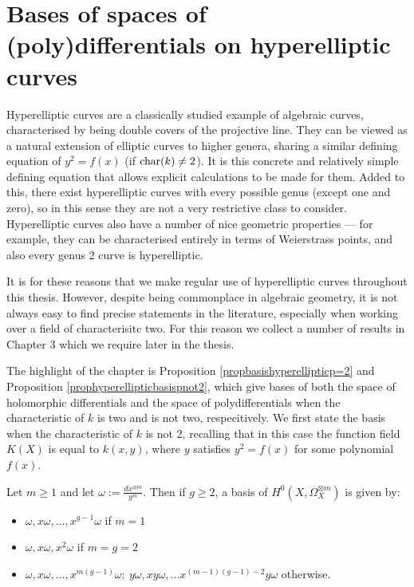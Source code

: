 \section{Bases of spaces of (poly)differentials on hyperelliptic curves}

Hyperelliptic curves are a classically studied example of algebraic curves, characterised by being double covers of the projective line.
They can be viewed as a natural extension of elliptic curves to higher genera, sharing a similar defining equation of $y^2 = f(x)$ (if $\operatorname{char}(k) \neq 2$).
It is this concrete and relatively simple defining equation that allows explicit calculations to be made for them.
Added to this, there exist hyperelliptic curves with every possible genus (except one and zero), so in this sense they are not a very restrictive class to consider.
Hyperelliptic curves also have a number of nice geometric properties --- for example, they can be characterised entirely in terms of Weierstrass points, and also every genus 2 curve is hyperelliptic.

It is for these reasons that we make regular use of hyperelliptic curves throughout this thesis.
However, despite being commonplace in algebraic geometry, it is not always easy to find precise statements in the literature, especially when working over a field of characterisitc two.
For this reason we collect a number of results in Chapter 3 which we require later in the thesis.

The highlight of the chapter is Proposition \ref{propbasishyperellipticp=2} and Proposition \ref{prophyperellipticbasispnot2}, which give bases of both the space of holomorphic differentials and the space of polydifferentials when the characteristic of $k$ is two and is not two, respecitively.
We first state the basis when the characteristic of $k$ is not 2, recalling that in this case the function field $K(X)$ is equal to $k(x,y)$, where $y$ satisfies $y^2 = f(x)$ for some polynomial $f(x)$.
    \begin{prop}
    Let $m\geq 1$ and let $\omega := \frac{dx^{\otimes m}}{y^m}$. 
    Then if $g\geq 2$, a basis of $H^0(X,\Omega_X^{\otimes m})$ is given by:
        \begin{itemize}
        \item $\omega, x\omega, \ldots , x^{g-1}\omega$ if $m=1$ 
        \item $\omega, x\omega, x^2\omega$  if $m=g=2$ 
        \item $\omega, x\omega, \ldots, x^{m(g-1)}\omega;\  y\omega, xy\omega, \ldots x^{(m-1)(g-1)-2}y\omega$ otherwise.
        \end{itemize}
    \end{prop}
    
